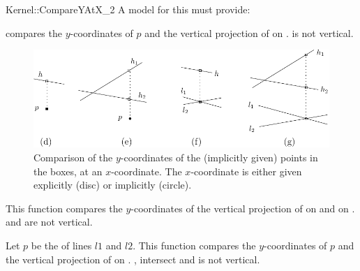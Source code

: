 \begin{ccRefFunctionObjectConcept}{Kernel::CompareYAtX_2}
A model for this must provide:


        {compares the $y$-coordinates of $p$ and the vertical projection
         of  on %
         .
         \ccPrecond {} is not vertical.
         }

\begin{ccTexOnly}
\begin{figure}[h]
\centerline{\includegraphics{Kernel_23_ref/fig/compare2}}
\caption{Comparison of the $y$-coordinates of the (implicitly given)
         points in the boxes, at an $x$-coordinate. The $x$-coordinate
         is either given explicitly (disc) or implicitly (circle).
         \label{fig-compare22}}
\end{figure} 
\end{ccTexOnly} 


{This function compares the $y$-coordinates of the vertical projection 
 of  on  and on %
 .
\ccPrecond {} and  are not vertical.}

      {Let $p$ be the  of lines $l1$ and $l2$.
       This function compares the $y$-coordinates of $p$ and 
       the vertical projection of  on %
       .
       \ccPrecond {},  intersect and  is not
       vertical.
      }




\end{ccRefFunctionObjectConcept}
